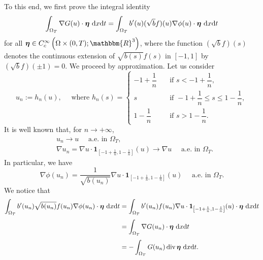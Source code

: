 \documentclass[11pt,  reqno]{amsart}%
\theoremstyle{plain}
\theoremstyle{definition}
\theoremstyle{remark}
\numberwithin{equation}{section}
\def\div{\,\mathrm{div}}
\newcommand{\dx}{\textup{d}x}
\newcommand{\dt}{\textup{d}t}
\begin{document}
To this end, we first prove the integral identity
\begin{equation}
    \label{nabla G}
   \int_{\Omega_T}  \nabla G(u) \cdot \boldsymbol{\eta} \ \dx \dt
   = \int_{\Omega_T}b'(u) ( \sqrt{b}f )(u) \nabla \phi(u)\cdot \boldsymbol{\eta} \ \dx \dt 
\end{equation}
for all $\boldsymbol{\eta} \in C_c^\infty\left( \Omega \times (0,T); \mathbbm{R}^3\right)$, where the function $(\sqrt{b}f)(s)$ denotes the  continuous extension of $\sqrt{b(s)}f(s)$ in $[-1,1]$ by $(\sqrt{b}f)(\pm 1)=0$.
We proceed by approximation. Let us consider
\begin{equation*}
    u_n:= h_n(u), \quad \mbox{ where } h_n(s)=\begin{cases}
        -1+\dfrac{1}{n} \quad &\mbox{if }s< -1+\dfrac{1}{n},\\[3pt]
        s&\mbox{if } -1+\dfrac{1}{n}\le s \le 1-\dfrac{1}{n},\\[3pt]
        1-\dfrac{1}{n} \quad &\mbox{if }s> 1-\dfrac{1}{n}.
    \end{cases}
\end{equation*}
It is well known that, for $n \to + \infty$,
\begin{align}
    &u_n \to u \quad \mbox{ a.e. in }\Omega_T, \label{conv un}\\[3pt]
    &\nabla u_n = \nabla u \cdot \mathbf{1}_{\left[ -1+\frac{1}{n},1-\frac{1}{n}\right]}(u) \to \nabla u \quad \mbox{ a.e. in }\Omega_T.\label{conv nabla un}
\end{align}
In particular, we have
\begin{equation}
\label{nabla phin}
\nabla \phi(u_n)= \dfrac{1}{\sqrt{b(u_n)}}\nabla u \cdot \mathbf{1}_{\left[ -1+\frac{1}{n},1-\frac{1}{n}\right]}(u) \quad \mbox{ a.e. in }\Omega_T.
\end{equation}
We notice that
\begin{align*}
    \int_{\Omega_T}b'(u_n)\sqrt{b(u_n)}f(u_n) \nabla \phi(u_n)\cdot \boldsymbol{\eta} \ \dx \dt &= \int_{\Omega_T}b'(u_n)f(u_n) \nabla u \cdot \mathbf{1}_{\left[ -1+\frac{1}{n},1-\frac{1}{n}\right]}(u) \cdot \boldsymbol{\eta} \ \dx \dt \\[3pt]
    &= \int_{\Omega_T} \nabla G(u_n)\cdot \boldsymbol{\eta} \ \dx \dt \\[3pt]
    &= -\int_{\Omega_T}  G(u_n) \div \, \boldsymbol{\eta} \ \dx \dt. 
\end{align*}
\end{document}
